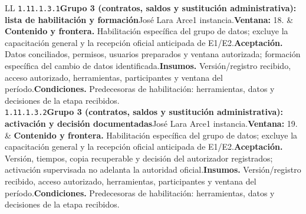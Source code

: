 \begin{longtable}{L{\tabcolsep\relax}L{\tabcolsep\relax}}
\texttt{1.\allowbreak{}11.\allowbreak{}1.\allowbreak{}3.\allowbreak{}1}\newline{}\textbf{Grupo 3 (contratos, saldos y sustitución administrativa): lista de habilitación y formación}\newline{}José Lara Arce\newline{}1 instancia.\newline{}\textbf{Ventana:} 18. & \textbf{Contenido y frontera.} Habilitación específica del grupo de datos; excluye la capacitación general y la recepción oficial anticipada de E1/E2.\newline{}\textbf{Aceptación.} Datos conciliados, permisos, usuarios preparados y ventana autorizada; formación específica del cambio de datos identificada.\newline{}\textbf{Insumos.} Versión/registro recibido, acceso autorizado, herramientas, participantes y ventana del período.\newline{}\textbf{Condiciones.} Predecesoras de habilitación: herramientas, datos y decisiones de la etapa recibidos.\\\hline
\texttt{1.\allowbreak{}11.\allowbreak{}1.\allowbreak{}3.\allowbreak{}2}\newline{}\textbf{Grupo 3 (contratos, saldos y sustitución administrativa): activación y decisión documentadas}\newline{}José Lara Arce\newline{}1 instancia.\newline{}\textbf{Ventana:} 19. & \textbf{Contenido y frontera.} Habilitación específica del grupo de datos; excluye la capacitación general y la recepción oficial anticipada de E1/E2.\newline{}\textbf{Aceptación.} Versión, tiempos, copia recuperable y decisión del autorizador registrados; activación supervisada no adelanta la autoridad oficial.\newline{}\textbf{Insumos.} Versión/registro recibido, acceso autorizado, herramientas, participantes y ventana del período.\newline{}\textbf{Condiciones.} Predecesoras de habilitación: herramientas, datos y decisiones de la etapa recibidos.\\\hline

\end{longtable}

